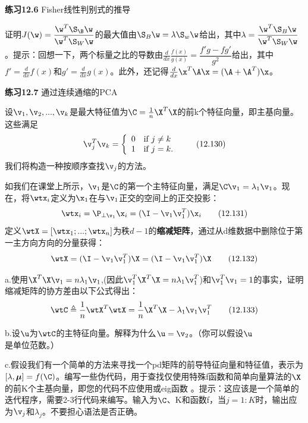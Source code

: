 \documentclass[a4paper]{article}
\begin{document}
\textbf{练习12.6} Fisher线性判别式的推导 

证明$J(\w)=\dfrac{\w^T\S_\B\w}{\w^T\S_W\w}$的最大值由$\S_B\w=\lambda\S_w\w$给出，其中$\lambda=\dfrac{\w^T\S_B\w}{\w^T\S_W\w}$。提示：回想一下，两个标量之比的导数由$\frac{d}{dx}\frac{f(x)}{g(x)}=\dfrac{f'g-fg'}{g^2}$给出，其中$f'=\frac{d}{dx}f(x)$和$g'=\frac{d}{dx}g(x)$。此外，还记得$\frac{d}{dx}\x^T\A\x=(\A+\A^T)\x$。 

\textbf{练习12.7} 通过连续通缩的PCA

设$\v_1,\v_2,...,\v_k$是最大特征值为$\C=\frac{1}{n}\X^T\X$的前k个特征向量，即主基向量。这些满足 
\begin{equation}
	\v_j^T\v_k=\left\{ 
\begin{array}{rl}

0 & \text{if } j\ne k\\
1 & \text{if } j=k.
\end{array} \right. \tag{12.130}
\end{equation}
我们将构造一种按顺序查找$\v_j$的方法。 

如我们在课堂上所示，$\v_1$是$\C $的第一个主特征向量，满足$\C\v_1=\lambda_1\v_1$。现在，将$\boldsymbol{\wtx}_i$定义为$\x_1$在与$\v_1$正交的空间上的正交投影： 
\begin{equation}
	\boldsymbol{\wtx}_i=\P_{\perp\v_1}\x_i=(\I-\v_1\v_1^T)\x_i\tag{12.131}
\end{equation}
定义$\boldsymbol{\wtX}=[\boldsymbol{\wtx}_1;...;\boldsymbol{\wtx}_n]$为秩$d-1$的\textbf{缩减矩阵}，通过从d维数据中删除位于第一主方向方向的分量获得： 
\begin{equation}
	\boldsymbol{\wtX}=(\I-\v_1\v_1^T)\X=(\I-\v_1\v_1^T)\X\tag{12.132}
\end{equation}

a.使用$\X^T\X\v_1=n\lambda_1\v_1$,(因此$\v_1^T\X^T\X=n\lambda_1\v_1^T$)和$\v_1^T\v_1=1$的事实，证明缩减矩阵的协方差由以下公式得出：
\begin{equation}
	\boldsymbol{\wtC} \triangleq \frac{1}{n}\boldsymbol{\wtX}^T\boldsymbol{\wtX}=\frac{1}{n}\X^T\X-\lambda_1\v_1\v_1^T\tag{12.133}
\end{equation}

b.设$\u$为$\boldsymbol{\wtC}$的主特征向量。解释为什么$\u=\v_2$。（你可以假设$\u$是单位范数。） 

c.假设我们有一个简单的方法来寻找一个pd矩阵的前导特征向量和特征值，表示为$[\lambda,\boldsymbol{\mu}]=f(\C)$。编写一些伪代码，用于查找仅使用特殊f函数和简单向量算法的$\X$的前K个主基向量，即您的代码不应使用或eig函数 。提示：这应该是一个简单的迭代程序，需要2-3行代码来编写。输入为$\C$、K和函数f，当$j=1:K$时，输出应为$\v_j$和$\lambda_j$。不要担心语法是否正确。 
\end{document}

